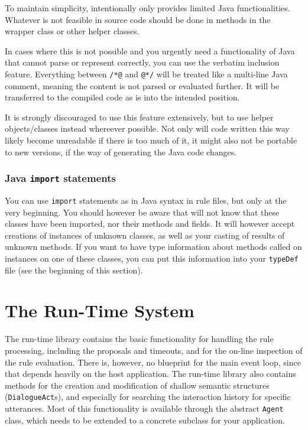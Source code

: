 To maintain simplicity, \vonda intentionally only provides limited Java
functionalities. Whatever is not feasible in \vonda source code should be done
in methods in the wrapper class or other helper classes.

In cases where this is not possible and you urgently need a
functionality of Java that \vonda cannot parse or represent correctly,
you can use the verbatim inclusion feature. Everything between
\verb|/*@| and \verb|@*/| will be treated like a multi-line Java
comment, meaning the content is not parsed or evaluated further. It
will be transferred to the compiled code as is into the intended
position.

It is strongly discouraged to use this feature extensively, but to use
helper objects/classes instead whereever possible. Not only will code
written this way likely become unreadable if there is too much of it,
it might also not be portable to new \vonda versions, if the way of
generating the Java code changes.

\subsubsection{Java \texttt{import}
  statements} \label{sec:java-import}

You can use \texttt{import} statements as in Java syntax in rule
files, but only at the very beginning. You should however be aware
that \vonda will not know that these classes have been imported, nor
their methods and fields. It will however accept creations of
instances of unknown classes, as well as your casting of results of
unknown methods. If you want \vonda to have type information about
methods called on instances on one of these classes, you can put this
information into your \texttt{typeDef} file (see the beginning of this
section).

\section{The Run-Time System}

The run-time library contains the basic functionality for handling the rule
processing, including the proposals and timeouts, and for the on-line
inspection of the rule evaluation. There is, however, no blueprint for the main
event loop, since that depends heavily on the host application. The run-time
library also contains methods for the creation and modification of shallow
semantic structures (\texttt{DialogueAct}s), and especially for searching the
interaction history for specific utterances. Most of this functionality is
available through the abstract \texttt{Agent} class, which needs to be extended
to a concrete subclass for your application.

